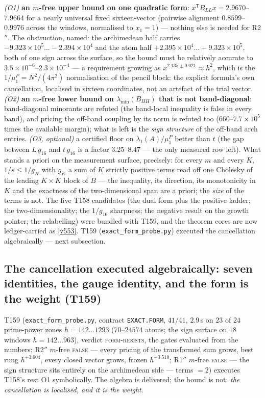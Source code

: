 \documentclass[11pt,a4paper]{article}
\begin{document}
\begin{keybox}
\emph{(O1)} \textbf{an $m$-free upper bound on one quadratic form}: $x^{\mathsf
T}B_{LL}x=2.9670$--$7.9664$ for a nearly universal fixed sixteen-vector (pairwise
alignment $0.8599$--$0.9976$ across the windows, normalised to $x_1=1$) --- nothing
else is needed for R2$''$. The obstruction, named: the archimedean half carries
$-9.323\times10^{5}\ldots-2.394\times10^{4}$ and the atom half
$+2.395\times10^{4}\ldots+9.323\times10^{5}$, both of one sign across the surface, so
the bound must be relatively accurate to $3.5\times10^{-6}$--$2.3\times10^{-4}$ --- a
requirement growing as $x^{2.135\pm0.021}\approx h^2$, which is the
$1/\mu^P_1=N^2/(4\pi^2)$ normalisation of the pencil block: the explicit formula's own
cancellation, localised in sixteen coordinates, not an artefact of the trial vector.
\emph{(O2)} \textbf{an $m$-free lower bound on $\lambda_{\min}(B_{HH})$ that is not
band-diagonal}: band-diagonal minorants are refuted (the band-local inequality is false
in every band), and pricing the off-band coupling by its norm is refuted too
($660$--$7.7\times10^{5}$ times the available margin); what is left is the \emph{sign
structure} of the off-band arch entries. \emph{(O3, optional)} a certified floor on
$\lambda_1(A)/\mu^P_1$ better than $t$ (the gap between $L\,g_{16}$ and $t\,g_{16}$ is
a factor $3.25$--$8.47$ --- the only measured row left). What stands a priori on the
measurement surface, precisely: for every $m$ and every $K$, $1/s\le1/g_K$ with $g_K$ a
sum of $K$ strictly positive terms read off one Cholesky of the leading $K\times K$
block of $B$ --- the inequality, its direction, its monotonicity in $K$ and the
exactness of the two-dimensional span are a priori; the \emph{size} of the terms is
not. The five T158 candidates (the dual form plus the positive ladder; the
two-dimensionality; the $1/g_{16}$ sharpness; the negative result on the growth
pointer; the relabelling) were bundled with T159, and the theorem cores are now
ledger-carried as \vref{v553}. T159 (\texttt{exact\_form\_probe.py}) executed the
cancellation algebraically --- next subsection.
\end{keybox}

\subsection{The cancellation executed algebraically: seven identities, the gauge
identity, and the form is the weight (T159)}
T159 (\texttt{exact\_form\_probe.py}, contract \texttt{EXACT.FORM}, $41/41$,
$2.9$\,s on $23$ of $24$ prime-power zones $h=142\ldots1293$ ($70$--$24574$ atoms;
the sign surface on $18$ windows $h=142\ldots963$), verdict \textsc{form-resists},
the gates evaluated from the numbers: R2$''$ $m$-free \textsc{false} --- every
pricing of the transformed sum grows, best rung $h^{+3.604}$, every closed vector
grows, frozen $h^{+3.510}$; R1$''$ $m$-free \textsc{false} --- the sign structure
sits entirely on the archimedean side --- terms $=2$) executes T158's rest O1
symbolically. The algebra is delivered; the bound is not: \emph{the cancellation
is localised, and it is the weight}.
\end{document}
